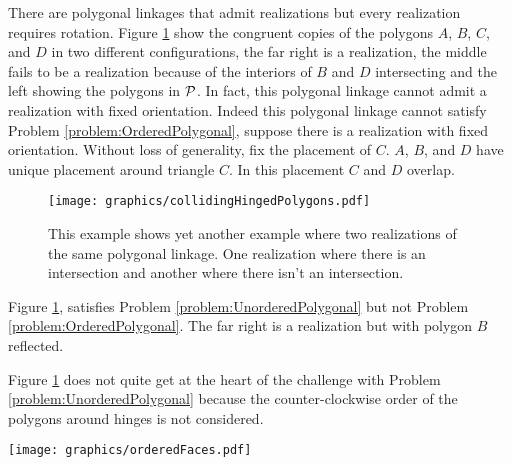 \documentclass[10pt]{CSUNthesis}
\theoremstyle{plain}%
\theoremstyle{definition}
\theoremstyle{remark}
\renewcommand{\PP}{{\cal P}} %
\begin{document}
There are polygonal linkages that admit realizations but every realization requires rotation.
Figure \ref{fig:collidingHingedPolygons} show the congruent copies of the polygons $A$, $B$, $C$, and $D$ in two different configurations, the far right is a realization, the middle fails to be a realization because of the interiors of $B$ and $D$ intersecting and the left showing the polygons in $\PP$.  
In fact, this polygonal linkage cannot admit a realization with fixed orientation.
Indeed this polygonal linkage cannot satisfy Problem \ref{problem:OrderedPolygonal}, suppose there is a realization with fixed orientation.  
Without loss of generality, fix the placement of $C$.
$A$, $B$, and $D$ have unique placement around triangle $C$.  
In this placement $C$ and $D$ overlap.%
\begin{figure}[!htbp]\label{fig:collidingHingedPolygons}
\begin{center}
\texttt{[image: graphics/collidingHingedPolygons.pdf]}
\end{center} 
\caption{This example shows yet another example where two realizations of the same polygonal linkage. 
 One realization where there is an intersection and another where there isn't an intersection.}
\end{figure}
Figure \ref{fig:collidingHingedPolygons}, satisfies Problem \ref{problem:UnorderedPolygonal} but not Problem \ref{problem:OrderedPolygonal}.
 The far right is a realization but with polygon $B$ reflected.

Figure \ref{fig:collidingHingedPolygons} does not quite get at the heart of the challenge with Problem \ref{problem:UnorderedPolygonal} because the counter-clockwise order of the polygons around hinges is not considered.

\begin{minipage}{\linewidth}
\begin{center}
\texttt{[image: graphics/orderedFaces.pdf]}
\end{center}
\label{fig:orderedFaces.pdf}
\end{minipage}
\end{document}
